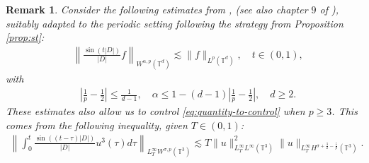 \documentclass[a4paper, reqno, 11pt]{amsart}
\newtheorem{remark}[theorem]{Remark}
\theoremstyle{definition}
\begin{document}
	\begin{remark}
	Consider the following estimates from \cite{SSS91}, \cite{Peral1980} (see also chapter $9$ of \cite{steinha}), suitably adapted to the periodic setting following the strategy from Proposition \ref{prop:st}:
	\begin{align}\label{eq:estimates_linear_torus}
		&\left\| \frac{\sin(t|D|)}{|D|} f \right\|_{W^{\alpha,p}(\mathbb{T}^d)} \lesssim \| f \|_{L^p(\mathbb{T}^d)}, \quad t \in (0,1),
	\end{align}
	with
	\begin{align*}
	&\left| \frac{1}{p} - \frac{1}{2} \right| \leq \frac{1}{d-1}, \quad \alpha \leq 1 - (d-1)\left| \frac{1}{p} - \frac{1}{2}\right|, \quad d \geq 2.
	\end{align*}
	These estimates also allow us to control \eqref{eq:quantity-to-control} when $p \geq 3$. This comes from the following inequality, given $T \in (0,1)$:
	\begin{align*}
			\left\| \int_0^t \frac{\sin((t-\tau)|D|)}{|D|} u^3(\tau) d\tau \right\|_{L^{\infty}_T W^{\sigma,p}(\mathbb{T}^3)} \lesssim T \| u \|_{L^{\infty}_T L^{\infty}(\mathbb{T}^3)}^2 \|u\|_{L^{\infty}_T H^{\sigma + \frac{3}{2} - \frac{5}{p}}(\mathbb{T}^3)}.
		\end{align*}	
	

\end{remark}
\end{document}

